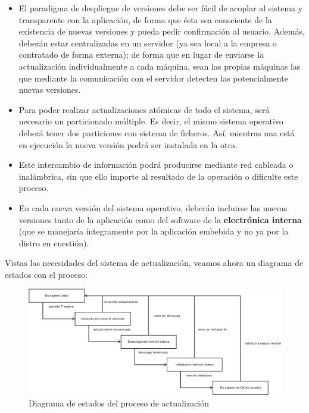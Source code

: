 \begin{itemize}
	\item El paradigma de despliegue de versiones debe ser fácil de acoplar al sistema y transparente con la aplicación, de forma que ésta sea consciente de la existencia de nuevas versiones y pueda pedir confirmación al usuario. Además, deberán estar centralizadas en un servidor (ya sea local a la empresa o contratado de forma externa); de forma que en lugar de enviarse la actualización individualmente a cada máquina, sean las propias máquinas las que mediante la comunicación con el servidor detecten las potencialmente nuevas versiones.
	\item Para poder realizar actualizaciones atómicas de todo el sistema, será necesario un particionado múltiple. Es decir, el mismo sistema operativo deberá tener dos particiones con sistema de ficheros. Así, mientras una está en ejecución la nueva versión podrá ser instalada en la otra.
	\item Este intercambio de información podrá producirse mediante red cableada o inalámbrica, sin que ello importe al resultado de la operación o dificulte este proceso.
	\item En cada nueva versión del sistema operativo, deberán incluirse las nuevas versiones tanto de la aplicación como del software de la \textbf{electrónica interna} (que se manejaría íntegramente por la aplicación embebida y no ya por la distro en cuestión).
\end{itemize}

Vistas las necesidades del sistema de actualización, veamos ahora un diagrama de estados con el proceso:

\begin{figure}[H]
	\centering
	\includegraphics[width=\linewidth]{imagenes/statechart-actualizacion.png}
	\caption{Diagrama de estados del proceso de actualización}
	\label{statechart-actualizacion}
\end{figure}

